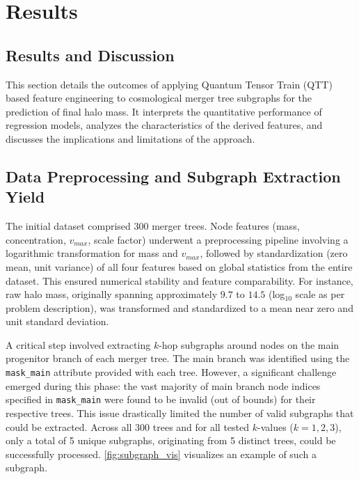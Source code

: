 \documentclass[twocolumn]{aastex631}
\begin{document}
\section{Results}
\label{sec:results}
\subsection{Results and Discussion}

This section details the outcomes of applying Quantum Tensor Train (QTT) based feature engineering to cosmological merger tree subgraphs for the prediction of final halo mass. It interprets the quantitative performance of regression models, analyzes the characteristics of the derived features, and discusses the implications and limitations of the approach.

\subsection{Data Preprocessing and Subgraph Extraction Yield}

The initial dataset comprised 300 merger trees. Node features (mass, concentration, $v_{max}$, scale factor) underwent a preprocessing pipeline involving a logarithmic transformation for mass and $v_{max}$, followed by standardization (zero mean, unit variance) of all four features based on global statistics from the entire dataset. This ensured numerical stability and feature comparability. For instance, raw halo mass, originally spanning approximately $9.7$ to $14.5$ (log$_{10}$ scale as per problem description), was transformed and standardized to a mean near zero and unit standard deviation.

A critical step involved extracting $k$-hop subgraphs around nodes on the main progenitor branch of each merger tree. The main branch was identified using the \texttt{mask\_main} attribute provided with each tree. However, a significant challenge emerged during this phase: the vast majority of main branch node indices specified in \texttt{mask\_main} were found to be invalid (out of bounds) for their respective trees. This issue drastically limited the number of valid subgraphs that could be extracted. Across all 300 trees and for all tested $k$-values ($k=1, 2, 3$), only a total of 5 unique subgraphs, originating from 5 distinct trees, could be successfully processed. \autoref{fig:subgraph_vis} visualizes an example of such a subgraph.
\end{document}
